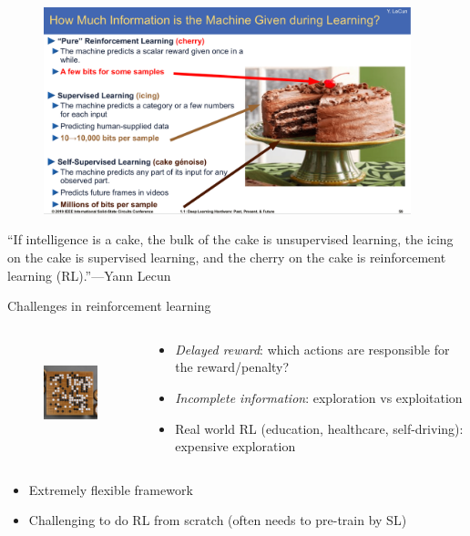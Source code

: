 \documentclass[usenames,dvipsnames,notes]{beamer}
\begin{document}
\begin{frame}
    {}
    \begin{figure}
        \includegraphics[height=6cm]{figures/yann-rl}
    \end{figure}
    ``If intelligence is a cake, the bulk of the cake is unsupervised learning, the icing on the cake is supervised learning, and the cherry on the cake is reinforcement learning (RL).''---Yann Lecun

\end{frame}

\begin{frame}
    {Challenges in reinforcement learning}
    \begin{columns}
        \begin{column}{.4\textwidth}
    \begin{figure}
        \includegraphics[height=3cm]{figures/go}
    \end{figure}
        \end{column}
        \begin{column}{.6\textwidth}
    \begin{itemize}
        \item \emph{Delayed reward}: which actions are responsible for the reward/penalty?
        \item \emph{Incomplete information}: exploration vs exploitation
        \item Real world RL (education, healthcare, self-driving): expensive exploration
    \end{itemize}
        \end{column}
    \end{columns}
    \bigskip
    \begin{itemize}
        \item Extremely flexible framework
        \item Challenging to do RL from scratch (often needs to pre-train by SL)
    \end{itemize}
\end{frame}
\end{document}
